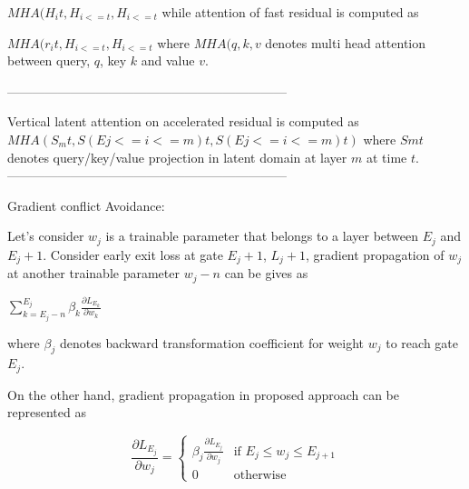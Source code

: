 $MHA(H_it, H_{i<=t}, H_{i<=t}$ while attention of fast residual is computed as 

$MHA(r_it, H_{i<=t}, H_{i<=t}$ where $MHA(q,k,v$ denotes multi head attention between query, $q$, key $k$ and value $v$.


------------------------------------------------------------------

Vertical latent attention on accelerated residual is computed as 
$MHA(S_mt, S(Ej<=i<=m)t, S(Ej<=i<=m)t)$ where $Smt$ denotes query/key/value projection in latent domain at layer $m$ at time $t$. 
------------------------------------------------------------------

Gradient conflict Avoidance: 

Let's consider $w_j$ is a trainable parameter that belongs to a layer between $E_j$ and $E_j+1$. Consider early exit loss at gate $E_j+1$, $L_j+1$, gradient propagation of $w_j$ at another trainable parameter $w_j-n$ can be gives as 

$\sum_{k=E_j-n}^{E_j} \beta_k \frac{\partial L_{E_k}}{\partial w_k}$

where $\beta_j$ denotes backward transformation coefficient for weight $w_j$ to reach gate $E_j$. 
 
On the other hand, gradient propagation in proposed approach can be represented as 

\[
\frac{\partial L_{E_j}}{\partial w_j} = 
\begin{cases} 
\beta_j \frac{\partial L_{E_j}}{\partial w_j} & \text{if } E_j \leq w_j \leq E_{j+1} \\
0 & \text{otherwise}
\end{cases}
\]

